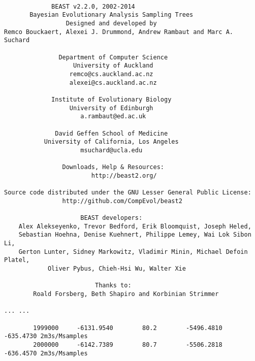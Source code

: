 \documentclass[12pt]{article}
\begin{document}
{\tiny   
\begin{verbatim}

             BEAST v2.2.0, 2002-2014
       Bayesian Evolutionary Analysis Sampling Trees
                 Designed and developed by
Remco Bouckaert, Alexei J. Drummond, Andrew Rambaut and Marc A. Suchard
                              
               Department of Computer Science
                   University of Auckland
                  remco@cs.auckland.ac.nz
                  alexei@cs.auckland.ac.nz
                              
             Institute of Evolutionary Biology
                  University of Edinburgh
                     a.rambaut@ed.ac.uk
                              
              David Geffen School of Medicine
           University of California, Los Angeles
                     msuchard@ucla.edu
                              
                Downloads, Help & Resources:
                    	http://beast2.org/
                              
Source code distributed under the GNU Lesser General Public License:
             	http://github.com/CompEvol/beast2
                              
                     BEAST developers:
	Alex Alekseyenko, Trevor Bedford, Erik Bloomquist, Joseph Heled, 
	Sebastian Hoehna, Denise Kuehnert, Philippe Lemey, Wai Lok Sibon Li, 
	Gerton Lunter, Sidney Markowitz, Vladimir Minin, Michael Defoin Platel, 
          	Oliver Pybus, Chieh-Hsi Wu, Walter Xie
                              
                         Thanks to:
    	Roald Forsberg, Beth Shapiro and Korbinian Strimmer

... ...

        1999000     -6131.9540        80.2        -5496.4810      -635.4730 2m3s/Msamples
        2000000     -6142.7389        80.7        -5506.2818      -636.4570 2m3s/Msamples


\end{verbatim}}
\end{document}
